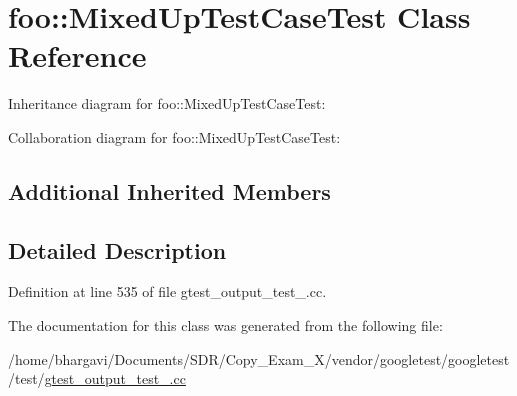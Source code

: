 \hypertarget{classfoo_1_1_mixed_up_test_case_test}{}\section{foo\+:\+:Mixed\+Up\+Test\+Case\+Test Class Reference}
\label{classfoo_1_1_mixed_up_test_case_test}


Inheritance diagram for foo\+:\+:Mixed\+Up\+Test\+Case\+Test\+:


Collaboration diagram for foo\+:\+:Mixed\+Up\+Test\+Case\+Test\+:
\subsection*{Additional Inherited Members}


\subsection{Detailed Description}


Definition at line 535 of file gtest\+\_\+output\+\_\+test\+\_\+.\+cc.



The documentation for this class was generated from the following file\+:\begin{DoxyCompactItemize}
\item 
/home/bhargavi/\+Documents/\+S\+D\+R/\+Copy\+\_\+\+Exam\+\_\+X/vendor/googletest/googletest/test/\hyperlink{gtest__output__test___8cc}{gtest\+\_\+output\+\_\+test\+\_\+.\+cc}\end{DoxyCompactItemize}
